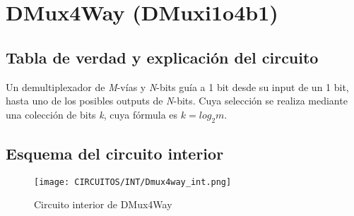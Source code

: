 \documentclass[12pt]{article}
\begin{document}
\section{DMux4Way (DMuxi1o4b1)} \label{dmux4label}
    \subsection{Tabla de verdad y explicación del circuito}
        Un demultiplexador de \textit{M}-vías y \textit{N}-bits guía a 1 bit desde su input de un 1 bit, hasta uno de los posibles outputs de \textit{N}-bits. Cuya selección se realiza mediante una colección de bits \textit{k}, cuya fórmula es $k = log_{2}m$. \label{dmux4text} \cite{nisan_nand2tetris_2005}
        \begin{table}[H]
        \centering
        \caption{Tabla de verdad de DMUX4WAY}
        \label{tab:tab_dmux4way}
        \end{table}

    \subsection{Esquema del circuito interior}
        \begin{figure}[H]
            \centering
            \texttt{[image: CIRCUITOS/INT/Dmux4way\_int.png]}            
            \caption{Circuito interior de DMux4Way \cite{circuitverse}}
            \label{fig:dmux4way_int}
        \end{figure}
        
\end{document}
